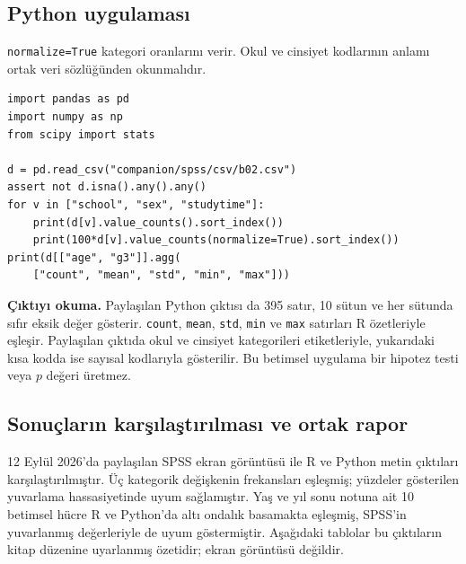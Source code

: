 \par\noindent\begin{minipage}{\linewidth}
\subsection{Python uygulaması}
\label{sec:python-b02}

\texttt{normalize=True} kategori oranlarını verir. Okul ve cinsiyet kodlarının anlamı ortak veri sözlüğünden okunmalıdır.

\begin{lstlisting}[style=prismPythonApp]
import pandas as pd
import numpy as np
from scipy import stats

d = pd.read_csv("companion/spss/csv/b02.csv")
assert not d.isna().any().any()
for v in ["school", "sex", "studytime"]:
    print(d[v].value_counts().sort_index())
    print(100*d[v].value_counts(normalize=True).sort_index())
print(d[["age", "g3"]].agg(
    ["count", "mean", "std", "min", "max"]))
\end{lstlisting}

\textbf{Çıktıyı okuma.} Paylaşılan Python çıktısı da 395 satır,
10 sütun ve her sütunda sıfır eksik değer gösterir. \texttt{count},
\texttt{mean}, \texttt{std}, \texttt{min} ve \texttt{max} satırları
R özetleriyle eşleşir. Paylaşılan çıktıda okul ve cinsiyet kategorileri
etiketleriyle, yukarıdaki kısa kodda ise sayısal kodlarıyla gösterilir.
Bu betimsel uygulama bir hipotez testi veya $p$ değeri üretmez.
\end{minipage}\par

\subsection{Sonuçların karşılaştırılması ve ortak rapor}
12 Eylül 2026'da paylaşılan SPSS ekran görüntüsü ile R ve Python
metin çıktıları karşılaştırılmıştır. Üç kategorik değişkenin frekansları
eşleşmiş; yüzdeler gösterilen yuvarlama hassasiyetinde uyum sağlamıştır.
Yaş ve yıl sonu notuna ait 10 betimsel hücre R ve Python'da altı ondalık
basamakta eşleşmiş, SPSS'in yuvarlanmış değerleriyle de uyum göstermiştir.
Aşağıdaki tablolar bu çıktıların kitap düzenine uyarlanmış özetidir;
ekran görüntüsü değildir.

